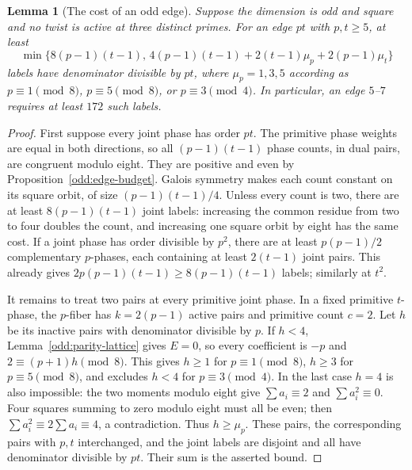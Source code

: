 \documentclass[11pt]{amsart}
\numberwithin{equation}{section}
\newtheorem{lemma}[theorem]{Lemma}
\theoremstyle{definition}
\theoremstyle{plain}
\begin{document}
\begin{lemma}[The cost of an odd edge]\label{odd:edge-reservation}
Suppose the dimension is odd and square and no twist is active at
three distinct primes. For an edge $pt$ with $p,t\ge5$, at least
\[
 \min\{8(p-1)(t-1),\,
 4(p-1)(t-1)+2(t-1)\mu_p+2(p-1)\mu_t\}
\]
labels have denominator divisible by $pt$, where
$\mu_p=1,3,5$ according as $p\equiv1\pmod8$, $p\equiv5\pmod8$,
or $p\equiv3\pmod4$. In particular, an edge $5$--$7$ requires
at least $172$ such labels.
\end{lemma}
\begin{proof}
First suppose every joint phase has order $pt$. The primitive phase
weights are equal in both directions, so all $(p-1)(t-1)$ phase
counts, in dual pairs, are congruent modulo eight. They are positive
and even by Proposition~\ref{odd:edge-budget}. Galois symmetry makes
each count constant on its square orbit, of size
$(p-1)(t-1)/4$. Unless every count is two, there are at least
$8(p-1)(t-1)$ joint labels: increasing the common residue from two
to four doubles the count, and increasing one square orbit by eight
has the same cost. If a joint phase has order divisible by $p^2$,
there are at least $p(p-1)/2$ complementary $p$-phases, each
containing at least $2(t-1)$ joint pairs. This already gives
$2p(p-1)(t-1)\ge8(p-1)(t-1)$ labels; similarly at $t^2$.

It remains to treat two pairs at every primitive joint phase.
In a fixed primitive $t$-phase, the $p$-fiber has
$k=2(p-1)$ active pairs and primitive count $c=2$. Let $h$ be
its inactive pairs with denominator divisible by $p$.
If $h<4$, Lemma~\ref{odd:parity-lattice} gives $E=0$, so every
coefficient is $-p$ and $2\equiv(p+1)h\pmod8$. This gives $h\ge1$ for
$p\equiv1\pmod8$, $h\ge3$ for $p\equiv5\pmod8$, and excludes
$h<4$ for $p\equiv3\pmod4$. In the last case $h=4$ is also
impossible: the two moments modulo eight give
$\sum a_i\equiv2$ and $\sum a_i^2\equiv0$.
Four squares summing to zero modulo eight must all be even;
then $\sum a_i^2\equiv2\sum a_i\equiv4$, a contradiction.
Thus $h\ge\mu_p$. These pairs, the corresponding pairs with
$p,t$ interchanged, and the joint labels are disjoint and all have
denominator divisible by $pt$. Their sum is the asserted bound.
\end{proof}
\end{document}
